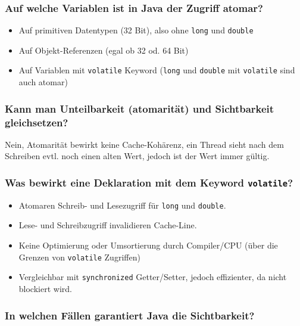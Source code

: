 \documentclass[10pt,a4paper]{scrartcl}
\begin{document}
\subsubsection{Auf welche Variablen ist in Java der Zugriff atomar?}

\begin{itemize}
	\item Auf primitiven Datentypen (32 Bit), also ohne \texttt{long} und \texttt{double}
	\item Auf Objekt-Referenzen (egal ob 32 od. 64 Bit)
	\item Auf Variablen mit \texttt{volatile} Keyword (\texttt{long} und \texttt{double} mit
		\texttt{volatile} sind auch atomar)
\end{itemize}
  
\subsubsection{Kann man Unteilbarkeit (atomarität) und Sichtbarkeit gleichsetzen?}

Nein, Atomarität bewirkt keine Cache-Kohärenz, ein Thread sieht nach dem Schreiben evtl. noch einen
alten Wert, jedoch ist der Wert immer gültig.
  
\subsubsection{Was bewirkt eine Deklaration mit dem Keyword \texttt{volatile}?}

\begin{itemize}
	\item Atomaren Schreib- und Lesezugriff für \texttt{long} und \texttt{double}.
	\item Lese- und Schreibzugriff invalidieren Cache-Line.
	\item Keine Optimierung oder Umsortierung durch Compiler/CPU (über die Grenzen von
		\texttt{volatile} Zugriffen)
	\item Vergleichbar mit \texttt{synchronized} Getter/Setter, jedoch effizienter, da nicht blockiert
		wird.
\end{itemize}
  
\subsubsection{In welchen Fällen garantiert Java die Sichtbarkeit?}
\end{document}

